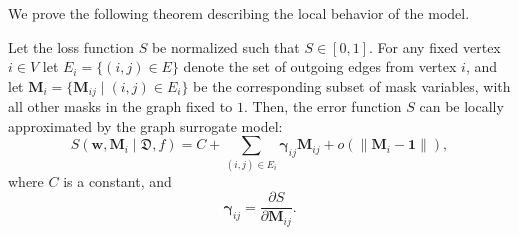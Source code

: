 We prove the following theorem describing the local behavior of the model.

\begin{theorem}
Let the loss function $S$ be normalized such that $S \in [0, 1]$. For any fixed vertex $i \in V$ let $E_i = \{(i,j) \in E\}$ denote the set of outgoing edges from vertex $i$, and let $\mathbf{M}_i = \{\mathbf{M}_{ij} \mid (i,j) \in E_i\}$ be the corresponding subset of mask variables, with all other masks in the graph fixed to $1$. Then, the error function $S$ can be locally approximated by the graph surrogate model:
\begin{equation}
S(\mathbf{w}, \mathbf{M}_i \mid \mathfrak{D}, f) = C + \sum_{(i,j) \in E_i} \boldsymbol{\gamma}_{ij} \mathbf{M}_{ij} + o(\|\mathbf{M}_i - \mathbf{1}\|),
\end{equation}
where $C$ is a constant, and
\begin{equation}
\boldsymbol{\gamma}_{ij} = \frac{\partial S}{\partial \mathbf{M}_{ij}}.
\end{equation}
\end{theorem}

